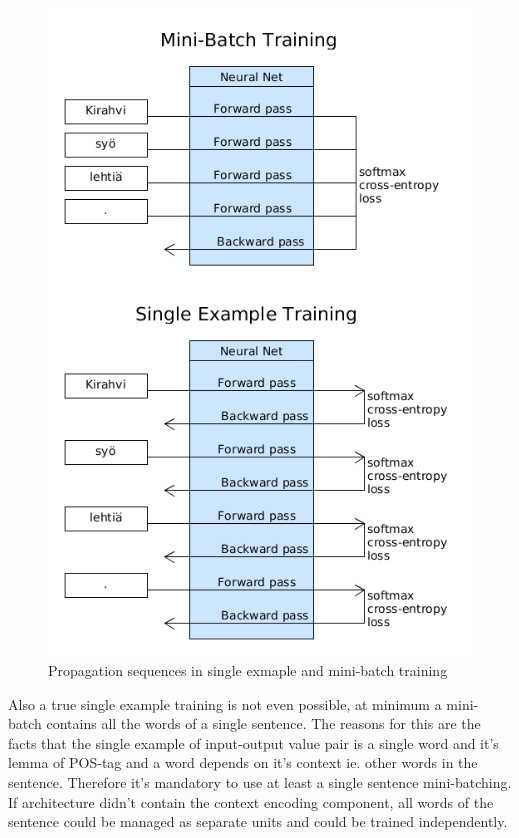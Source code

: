 \documentclass[12pt,a4paper,english
]{tutthesis}
\begin{document}
\begin{figure}[htbp]
\caption{Propagation sequences in single exmaple and mini-batch training}
\label{figure:single_vs_batch}
\centering
\includegraphics[width=12cm]{single_vs_batch.png}
\end{figure}

Also a true single example training is not even possible, at minimum a mini-batch contains all the words of a single sentence. The reasons for this are the facts that the single example of input-output value pair is a single word and it's lemma of POS-tag and a word depends on it's context ie. other words in the sentence. Therefore it's mandatory to use at least a single sentence mini-batching. If architecture didn't contain the context encoding component, all words of the sentence could be managed as separate units and could be trained independently.
\end{document}
